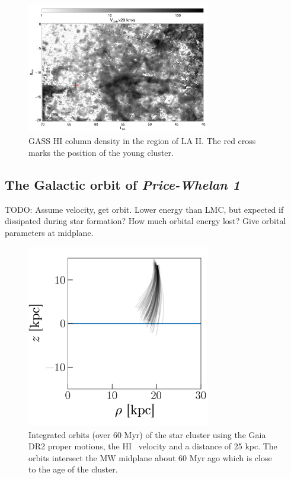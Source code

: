 \documentclass[modern]{aastex62}
\newcommand{\todo}[1]{{\color{red} TODO: #1}}
\newcommand{\hi}{H{\footnotesize I} }
\newcommand{\clustername}{\textsl{Price-Whelan 1}}
\begin{document}
\begin{figure}
\centering
\includegraphics[width=8cm]{gass_mlatmlon.pdf}
\caption{GASS \hi column density in the region of LA II. The red cross marks the position
of the young cluster.}
\label{fig_gass}
\end{figure}


\subsection{The Galactic orbit of \clustername}
\label{sec:orbit}

\todo{Assume velocity, get orbit. Lower energy than LMC, but expected if dissipated during star formation? How much orbital energy lost? Give orbital parameters at midplane.}

\begin{figure}
\centering
\includegraphics[width=8cm]{orbits.png}
\caption{Integrated orbits (over 60 Myr) of the star cluster using the Gaia DR2 proper motions, the
\hi~velocity and a distance of 25 kpc.  The orbits intersect the MW midplane about
60 Myr ago which is close to the age of the cluster.}
\label{fig_gass}
\end{figure}
\end{document}

